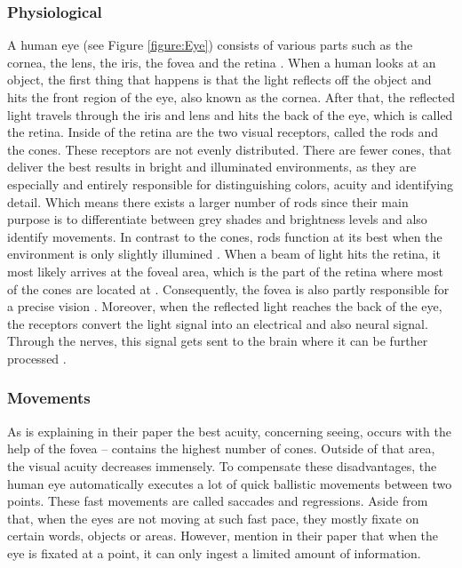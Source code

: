 \subsubsection{Physiological}
A human eye (see Figure \ref{figure:Eye}) consists of various parts such as the cornea, the lens, the iris, the fovea and the retina \autocite{djamasbi2014eye}. When a human looks at an object, the first thing that happens is that the light reflects off the object and hits the front region of the eye, also known as the cornea. After that, the reflected light travels through the iris and lens and hits the back of the eye, which is called the retina. Inside of the retina are the two visual receptors, called the rods and the cones. These receptors are not evenly distributed. There are fewer cones, that deliver the best results in bright and illuminated environments, as they are especially and entirely responsible for distinguishing colors, acuity and identifying detail. Which means there exists a larger number of rods since their main purpose is to differentiate between grey shades and brightness levels and also identify movements. In contrast to the cones, rods function at its best when the environment is only slightly illumined \autocite{djamasbi2014eye, biedert2010eyebook}.
When a beam of light hits the retina, it most likely arrives at the foveal area, which is the part of the retina where most of the cones are located at \autocite{djamasbi2014eye}. Consequently, the fovea is also partly responsible for a precise vision \autocite{biedert2010eyebook}.
Moreover, when the reflected light reaches the back of the eye, the receptors convert the light signal into an electrical and also neural signal. Through the nerves, this signal gets sent to the brain where it can be further processed \autocite{djamasbi2014eye}.

\subsubsection{Movements}
As \textcite{djamasbi2014eye} is explaining in their paper the best acuity, concerning seeing, occurs with the help of the fovea -- contains the highest number of cones. Outside of that area, the visual acuity decreases immensely. To compensate these disadvantages, the human eye automatically executes a lot of quick ballistic movements between two points. These fast movements are called saccades and regressions.
Aside from that, when the eyes are not moving at such fast pace, they mostly fixate on certain words, objects or areas. However, \textcite{biedert2010eyebook} mention in their paper that when the eye is fixated at a point, it can only ingest a limited amount of information.

